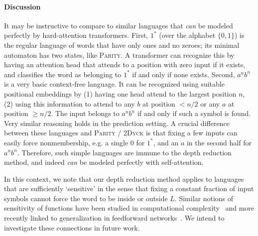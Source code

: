 \documentclass[11pt,a4paper]{article}
\newcounter{theorem}
\newtheorem{corollary}[theorem]{Corollary}
\begin{document}
\paragraph{Discussion}
It may be instructive to compare to similar languages that \emph{can} be modeled perfectly by hard-attention transformers.
First, $1^*$ (over the alphabet $\{0,1\}$) is the regular language of words that have only ones and no zeroes; its minimal automaton has two states, like \textsc{Parity}.
A transformer can recognize this by having an attention head that attends to a position with zero input if it exists, and classifies the word as belonging to $1^*$ if and only if none exists.
Second, $a^nb^n$ is a very basic context-free language.
It can be recognized using suitable positional embeddings by (1) having one head attend to the largest position $n$, (2) using this information to attend to any $b$ at position $<n/2$ or any $a$ at position $\geq n/2$. The input belongs to $a^nb^n$ if and only if such a symbol is found.
Very similar reasoning holds in the prediction setting.
A crucial difference between these languages and \textsc{Parity} / \textsc{2Dyck} is that fixing a few inputs can easily force nonmembership, e.g. a single 0 for $1^*$, and an $a$ in the second half for $a^nb^n$.
Therefore, such simple languages are immune to the depth reduction method, and indeed \emph{can} be modeled perfectly with self-attention.


In this context, we note that our depth reduction method applies to languages that are sufficiently `sensitive' in the sense that fixing a constant fraction of input symbols cannot force the word to be inside or outside $L$.
Similar notions of sensitivity of functions %
have been studied in computational complexity~\cite{boppana1997average,gilmer2015new,gopalan2016smooth,rossman2018average} and more recently linked to generalization in feedforward networks~\cite{de2018deep}.
We intend to investigate these connections in future work.

\end{document}
